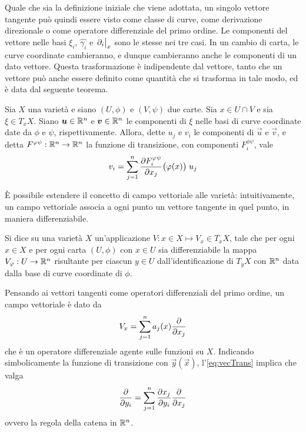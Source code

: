 Quale che sia la definizione iniziale che viene adottata, un singolo vettore tangente può quindi essere visto come classe di curve, come derivazione direzionale o come operatore differenziale del primo ordine. Le componenti del vettore nelle basi  $\xi_i$, $\hat{\gamma_i}$ e $\eval{\partial_i}_x$ sono le stesse nei tre casi. In un cambio di carta, le curve coordinate cambieranno, e dunque cambieranno anche le componenti di un dato vettore. Questa trasformazione è indipendente dal vettore, tanto che un vettore può anche essere definito come quantità che si trasforma in tale modo, ed è data dal seguente teorema.
\begin{theorem} 
  Sia $X$ una varietà e siano $(U,\phi)$ e $(V,\psi)$ due carte. Sia $x \in  U \cap V$ e sia $\xi \in  T_x X$. Siano $\boldsymbol{u} \in \mathbb{R}^{n}$ e $\boldsymbol{v} \in  \mathbb{R}^{n}$ le componenti di $\xi$ nelle basi di curve coordinate date da $\phi$ e $\psi$, rispettivamente. Allora, dette $u_j$ e $v_i$ le componenti di $\vec{u}$ e $\vec{v}$, e detta $F^{\varphi\psi}:\mathbb{R}^{n} \to \mathbb{R}^{n}$ la funzione di transizione, con componenti $F^{\phi \psi}_i$, vale \begin{equation} \label{eq:vecTrans}
  v_i = \sum_{j=1}^n \pdv{F^{\varphi\psi}_i}{x_j}\big(\varphi(x)\big)\; u_j
  \end{equation} 
\end{theorem}

È possibile estendere il concetto di campo vettoriale alle varietà: intuitivamente, un campo vettoriale associa a ogni punto un vettore tangente in quel punto, in maniera differenziabile.
\begin{definition} \label{def:vecField}
  Si dice  su una varietà $X$ un'applicazione $V: x \in  X \mapsto V_x \in T_x X$, tale che per ogni $x \in X$ e per ogni carta $(U, \phi)$ con $x \in U$ sia differenziabile la mappa $V_\varphi:U \to \mathbb{R}^{n}$ risultante per ciascun $y \in  U$ dall'identificazione di $T_y X$ con $\mathbb{R}^{n}$ data dalla base di curve coordinate di $\phi$.
\end{definition}

Pensando ai vettori tangenti come operatori differenziali del primo ordine, un campo vettoriale è dato da
\begin{equation}
  V_x = \sum_{j=1}^{n} a_j(x) \pdv{x_j}
\end{equation} 
che è un operatore differenziale agente sulle funzioni su $X$. Indicando simbolicamente la funzione di transizione con $\vec{y}(\vec{x})$, l'\autoref{eq:vecTrans} implica che valga 
\begin{equation}
  \pdv{y_i} = \sum_{j=1}^{n} \pdv{x_j}{y_i} \pdv{x_j}
\end{equation} 
ovvero la regola della catena in $\mathbb{R}^{n}$.

